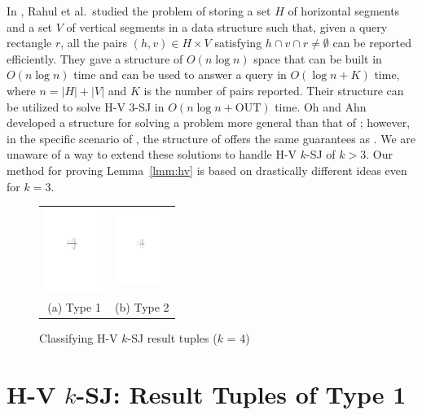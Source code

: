 \documentclass[acmsmall,review,anonymous]{acmart}
\def\extraspacing{\vspace{2mm} \noindent}
\def\figcapup{\vspace{-2mm}}
\def\figcapdown{\vspace{-3mm}}
\def\out{\mathrm{OUT}}
\begin{document}
\extraspacing {\bf Remark.} In \cite{rdr+11}, Rahul et al.\ studied the problem of storing a set $H$ of horizontal segments and a set $V$ of vertical segments in a data structure such that, given a query rectangle $r$, all the pairs $(h, v) \in H \times V$ satisfying $h \cap v \cap r \ne \emptyset$ can be reported efficiently. They gave a structure of $O(n \log n)$ space that can be built in $O(n \log n)$ time and can be used to answer a query in $O(\log n + K)$ time, where $n = |H| + |V|$ and $K$ is the number of pairs reported. Their structure can be utilized to solve H-V 3-SJ in $O(n \log n + \out)$ time. Oh and Ahn \cite{oa19} developed a structure for solving a problem more general than that of \cite{rdr+11}; however, in the specific scenario of \cite{rdr+11}, the structure of \cite{oa19} offers the same guarantees as \cite{rdr+11}. We are unaware of a way to extend these solutions to handle H-V $k$-SJ of $k > 3$. Our method for proving Lemma~\ref{lmm:hv} is based on drastically different ideas even for $k = 3$.


\begin{figure}
    \begin{tabular}{cc}
        \includegraphics[height=27mm]{./artwork/type1} &
        \hspace{5mm} \includegraphics[height=23mm]{./artwork/type2} \\
        (a) Type 1 &
        (b) Type 2
    \end{tabular}

    \figcapup
    \caption{Classifying H-V $k$-SJ result tuples ($k$ = 4)}
    \label{fig:hv:types}
    \figcapdown
\end{figure}

\section{H-V $k$-SJ: Result Tuples of Type 1} \label{sec:hv:type1}
\end{document}

